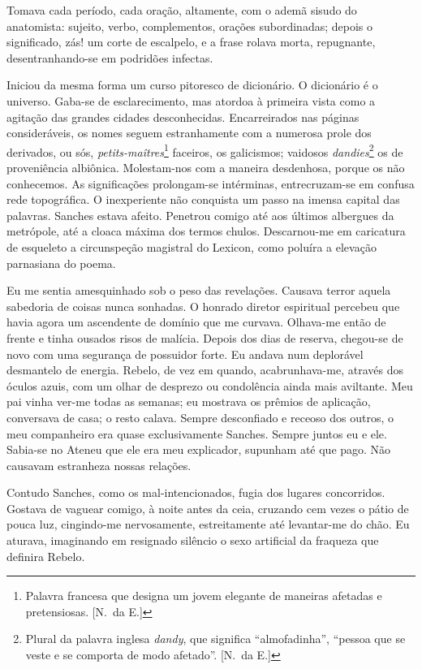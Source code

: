 Tomava cada período, cada oração,
altamente, com o ademã sisudo do anatomista: sujeito, verbo,
complementos, orações subordinadas; depois o significado, zás! um corte
de escalpelo, e a frase rolava morta, repugnante, desentranhando{}-se
em podridões infectas. 

Iniciou da mesma forma um curso pitoresco de
dicionário. O dicionário é o universo. Gaba{}-se de esclarecimento, mas
atordoa à primeira vista como a agitação das grandes cidades
desconhecidas. Encarreirados nas páginas consideráveis, os nomes seguem
estranhamente com a numerosa prole dos derivados, ou sós,
\textit{petits{}-maîtres}\footnote{ Palavra francesa que designa um jovem elegante 
de maneiras afetadas e pretensiosas. [N.~da E.]} 
faceiros, os galicismos; vaidosos \textit{dandies}\footnote{ Plural da palavra 
inglesa \textit{dandy}, que significa ``almofadinha'', 
``pessoa que se veste e se comporta de modo afetado''. [N.~da E.]} os de
proveniência albiônica. Molestam{}-nos com a maneira desdenhosa, porque
os não conhecemos. As significações prolongam{}-se intérminas,
entrecruzam{}-se em confusa rede topográfica. O inexperiente não
conquista um passo na imensa capital das palavras. Sanches estava
afeito. Penetrou comigo até aos últimos albergues da metrópole, até a cloaca máxima dos termos chulos.
Descarnou{}-me em caricatura de esqueleto a circunspeção magistral do
Lexicon, como poluíra a elevação parnasiana do poema. 

Eu me sentia amesquinhado sob o peso das revelações. Causava terror aquela sabedoria
de coisas nunca sonhadas. O honrado diretor espiritual percebeu que
havia agora um ascendente de domínio que me curvava. Olhava{}-me então
de frente e tinha ousados risos de malícia. Depois dos dias de reserva,
chegou{}-se de novo com uma segurança de possuidor forte. Eu andava num
deplorável desmantelo de energia. Rebelo, de vez em quando,
acabrunhava{}-me, através dos óculos azuis, com um olhar de desprezo ou
condolência ainda mais aviltante. Meu pai vinha ver{}-me todas as
semanas; eu mostrava os prêmios de aplicação, conversava de casa; o
resto calava. Sempre desconfiado e receoso dos outros, o meu
companheiro era quase exclusivamente Sanches. Sempre juntos eu e ele.
Sabia{}-se no Ateneu que ele era meu explicador, supunham até que pago.
Não causavam estranheza nossas relações. 

Contudo Sanches, como os mal{}-intencionados, fugia dos lugares concorridos. 
Gostava de vaguear comigo, à noite antes da ceia, cruzando cem vezes o pátio de pouca luz,
cingindo{}-me nervosamente, estreitamente até levantar{}-me do chão. Eu
aturava, imaginando em resignado silêncio o sexo artificial da fraqueza
que definira Rebelo. 

